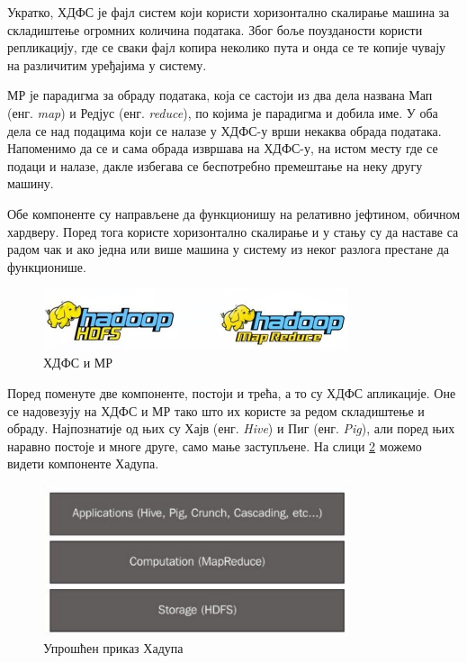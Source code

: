 \documentclass[12pt,oneside]{memoir}
\begin{document}
Укратко, ХДФС је фајл систем који користи хоризонтално скалирање машина за складиштење огромних количина података. Због боље поузданости користи репликацију, где се сваки фајл копира неколико пута и онда се те копије чувају на различитим уређајима у систему. \cite{hadoop_beginner}

МР је парадигма за обраду података, која се састоји из два дела названа Мап (енг. \textit{map}) и Редјус (енг. \textit{reduce}), по којима је парадигма и добила име. У оба дела се над подацима који се налазе у ХДФС-у врши некаква обрада података. Напоменимо да се и сама обрада извршава на ХДФС-у, на истом месту где се подаци и налазе, дакле избегава се беспотребно премештање на неку другу машину. \cite{hadoop_beginner}

Обе компоненте су направљене да функционишу на релативно јефтином, обичном хардверу. Поред тога користе хоризонтално скалирање и у стању су да наставе са радом чак и ако једна или више машина у систему из неког разлога престане да функционише.

\begin{figure}[!ht]
  \centering
  \includegraphics[width=0.8\textwidth]{pictures/hdfs_mr_logo.png}
  \caption{ХДФС и МР}
  \label{fig:hdfs_mr_logo}
\end{figure}

Поред поменуте две компоненте, постоји и трећа, а то су ХДФС апликације. Оне се надовезују на ХДФС и МР тако што их користе за редом складиштење и обраду. Најпознатије од њих су Хајв (енг. \textit{Hive}) и Пиг (енг. \textit{Pig}), али поред њих наравно постоје и многе друге, само мање заступљене. На слици \ref{fig:hadoop_aplikacije} можемо видети компоненте Хадупа. \cite{hadoop_learning}

\begin{figure}[!ht]
  \centering
  \includegraphics[width=0.8\textwidth]{pictures/hadoop_apps.png}
  \caption{Упрошћен приказ Хадупа}
  \label{fig:hadoop_aplikacije}
\end{figure}
\end{document}
